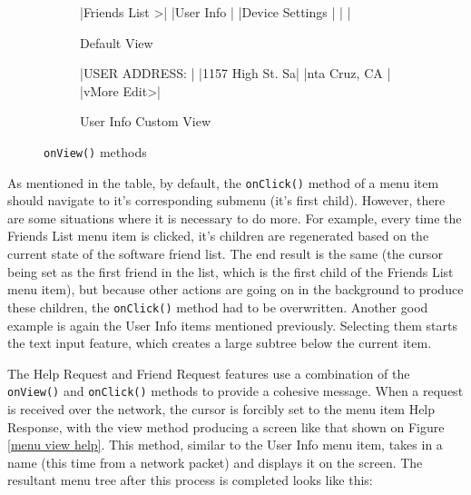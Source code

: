 \documentclass[journal,compsoc]{IEEEtran}
\begin{document}
\begin{figure}
  \begin{subfigure}{0.48\textwidth}
  	\centering
     |Friends List   >|
                |User Info       |
                |Device Settings |
                |                |
    \caption{Default View}
    \label{menu view default}
  \end{subfigure}
  \begin{subfigure}{0.48\textwidth}
    \centering
     |USER ADDRESS:   |
                |1157 High St. Sa|
                |nta Cruz, CA    |
                |vMore      Edit>|
    \caption{User Info Custom View}
    \label{menu view user info}
  \end{subfigure}
  \caption{\lstinline[columns=fixed]{onView()} methods}
\end{figure}

As mentioned in the table, by default, the \lstinline[columns=fixed]{onClick()} method of a menu item should navigate to it's corresponding submenu (it's first child). However, there are some situations where it is necessary to do more. For example, every time the Friends List menu item is clicked, it's children are regenerated based on the current state of the software friend list. The end result is the same (the cursor being set as the first friend in the list, which is the first child of the Friends List menu item), but because other actions are going on in the background to produce these children, the \lstinline[columns=fixed]{onClick()} method had to be overwritten. Another good example is again the User Info items mentioned previously. Selecting them starts the text input feature, which creates a large subtree below the current item.

The Help Request and Friend Request features use a combination of the \lstinline[columns=fixed]{onView()} and \lstinline[columns=fixed]{onClick()} methods to provide a cohesive message. When a request is received over the network, the cursor is forcibly set to the menu item Help Response, with the view method producing a screen like that shown on Figure \ref{menu view help}. This method, similar to the User Info menu item, takes in a name (this time from a network packet) and displays it on the screen. The resultant menu tree after this process is completed looks like this:
\end{document}
